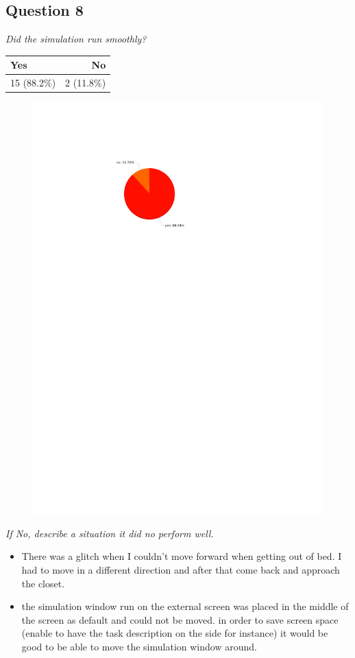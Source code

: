 \subsection{Question 8}\label{question1:8}
\emph{Did the simulation run smoothly?}
\begin{table}[H]
	\begin{center}
		\small \begin{tabular*}{0.35\columnwidth}{lr}
			\\ \hline \hline
			Yes & No \\ \hline \hline

		 	15 (88.2\%) & 2 (11.8\%)\\ \hline
		\end{tabular*}
	\end{center}
\end{table}

\begin{figure}[H]
	\centering
	\includegraphics[width=0.6\linewidth]{gfx/Chapter_EvaluationResults/ALFTask/question8}
\end{figure}

\emph{If No, describe a situation it did no perform well.}
\begin{itemize}
	\item There was a glitch when I couldn't move forward when getting out of bed. I had to move in a different direction and after that come back and approach the closet.
	\item the simulation window run on the external screen was placed in the middle of the screen as default and could not be moved. in order to save screen space (enable to have the task description on the side for instance) it would be good to be able to move the simulation window around.
\end{itemize}

